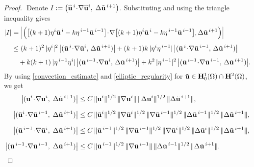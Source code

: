 \documentclass[10pt,a4paper]{amsart}
\begin{document}
\begin{proof}
$ $\newline
Denote $
I:=\bigl(\widehat {\bf u}^{\,i}\!\cdot\!\nabla \widehat {\bf u}^{i},\;\Delta\tilde {\bf u}^{\,i+1}\bigr)$.
Substituting and using the triangle inequality 
gives
\begin{align*}
|I|
&= \Bigl|\Bigl(\big[(k+1)\eta^{i}\bar {\bf u}^{\,i}-k\eta^{\,i-1}\bar {\bf u}^{\,i-1}\big]\!\cdot\!\nabla \big[(k+1)\eta^{i}\bar {\bf u}^{\,i}-k\eta^{\,i-1}\bar {\bf u}^{\,i-1}\big],
\Delta\tilde {\bf u}^{\,i+1}\Bigr)\Bigr|\\[4pt]
&\le (k+1)^2\,|\eta^{i}|^2\,
    \bigl|(\bar {\bf u}^{\,i}\!\cdot\!\nabla \bar {\bf u}^{i},\,\Delta\tilde {\bf u}^{\,i+1})\bigr|
  +(k+1)k\,|\eta^{i}\eta^{\,i-1}|\,
    \bigl|(\bar {\bf u}^{\,i}\!\cdot\!\nabla \bar {\bf u}^{\,i-1},\,\Delta\tilde {\bf u}^{\,i+1})\bigr|\\[4pt]
&\quad +k(k+1)\,|\eta^{\,i-1}\eta^{i}|\,
    \bigl|(\bar {\bf u}^{\,i-1}\!\cdot\!\nabla \bar {\bf u}^{i},\,\Delta\tilde {\bf u}^{\,i+1})\bigr|
  +k^2\,|\eta^{\,i-1}|^2\,
    \bigl|(\bar {\bf u}^{\,i-1}\!\cdot\!\nabla \bar{\bf u}^{\,i-1},\,\Delta\tilde {\bf u}^{\,i+1})\bigr|.
\end{align*}
%
By using \eqref{convection_estimate} and \eqref{elliptic_regularity} for $\tilde{\bf u} \in {\bf H}^1_0(\Omega)\cap {\bf H}^2(\Omega)$, we get
\[
\begin{aligned}
\bigl|(\bar {\bf u}^{i}\!\cdot\!\nabla \bar {\bf u}^{i},\;\Delta\tilde {\bf u}^{\,i+1})\bigr|
&\le C\,\|\bar {\bf u}^{i}\|^{1/2}\,\|\nabla\bar {\bf u}^{i}\|\,\|\Delta\bar {\bf u}^{i}\|^{1/2}\,\|\Delta\tilde {\bf u}^{\,i+1}\|,\\[6pt]
\bigl|(\bar {\bf u}^{i}\!\cdot\!\nabla \bar {\bf u}^{\,i-1},\;\Delta\tilde {\bf u}^{\,i+1})\bigr|
&\le C\,\|\bar {\bf u}^{i}\|^{1/2}\,\|\nabla\bar {\bf u}^{i}\|^{1/2}\,
     \|\nabla\bar {\bf u}^{\,i-1}\|^{1/2}\,\|\Delta\bar {\bf u}^{\,i-1}\|^{1/2}\,\|\Delta\tilde {\bf u}^{\,i+1}\|,\\[6pt]
\bigl|(\bar {\bf u}^{\,i-1}\!\cdot\!\nabla \bar {\bf u}^{i},\;\Delta\tilde {\bf u}^{\,i+1})\bigr|
&\le C\,\|\bar {\bf u}^{\,i-1}\|^{1/2}\,\|\nabla\bar {\bf u}^{\,i-1}\|^{1/2}\,
     \|\nabla\bar {\bf u}^{i}\|^{1/2}\,\|\Delta\bar {\bf u}^{i}\|^{1/2}\,\|\Delta\tilde {\bf u}^{\,i+1}\|,\\[6pt]
\bigl|(\bar {\bf u}^{\,i-1}\!\cdot\!\nabla \bar {\bf u}^{\,i-1},\;\Delta\tilde {\bf u}^{\,i+1})\bigr|
&\le C\,\|\bar {\bf u}^{\,i-1}\|^{1/2}\,\|\nabla\bar {\bf u}^{\,i-1}\|\,\|\Delta\bar {\bf u}^{\,i-1}\|^{1/2}\,\|\Delta\tilde {\bf u}^{\,i+1}\|.
\end{aligned}
\]


\end{proof}
\end{document}
